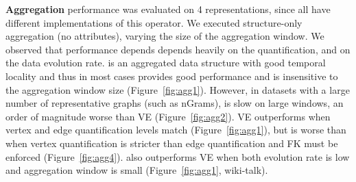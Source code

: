 {\bf Aggregation} performance was evaluated on 4 representations,
since all have different implementations of this operator.  We
executed structure-only aggregation (no attributes), varying the size
of the aggregation window.  We observed that performance depends
depends heavily on the quantification, and on the data evolution rate.
\og is an aggregated data structure with good temporal locality and
thus in most cases provides good performance and is insensitive to the
aggregation window size (Figure~\ref{fig:agg1}).  However, in datasets
with a large number of representative graphs (such as nGrams), \og is
slow on large windows, an order of magnitude worse than VE
(Figure~\ref{fig:agg2}).  VE outperforms \og when vertex and edge
quantification levels match (Figure~\ref{fig:agg1}), but is worse than
\og when vertex quantification is stricter than edge quantification
and FK must be enforced (Figure~\ref{fig:agg4}).  \og also outperforms
VE when both evolution rate is low and aggregation window is small
(Figure~\ref{fig:agg1}, wiki-talk).

